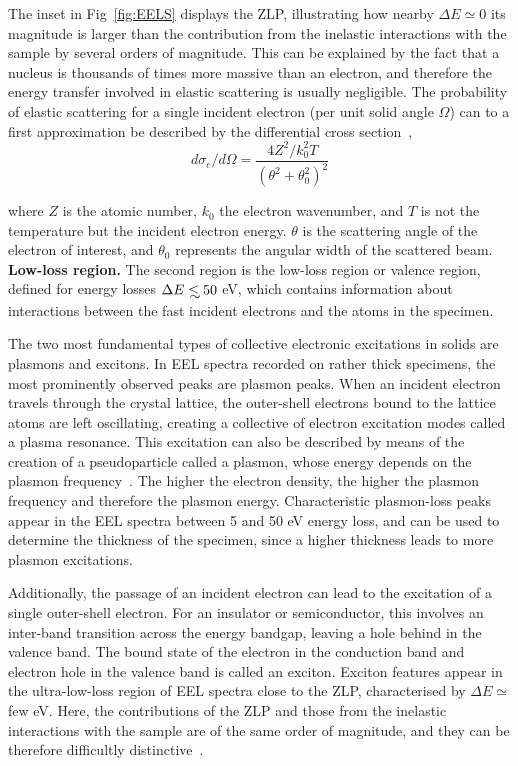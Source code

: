 The inset in Fig~\ref{fig:EELS} displays the ZLP, illustrating how nearby $\Delta E\simeq 0$
its magnitude is larger than the contribution from the inelastic interactions
with the sample by several orders of magnitude.
%
This can be explained by the fact that a nucleus is thousands of times more massive than an electron, 
and therefore the energy transfer involved in elastic scattering is usually negligible. 
%
The probability of elastic scattering for a single incident electron 
(per unit solid angle $\Omega$) can to a first approximation be described by 
the differential cross section~\cite{Egerton:1996},
\begin{equation}
    d\sigma_e / d\Omega = \frac{4Z^2/k_0^2T}{(\theta^2 + \theta_0^2)^2}
\end{equation}

where $Z$ is the atomic number, $k_0$ the electron wavenumber, 
and $T$ is not the temperature but the incident electron energy. 
$\theta$ is the scattering angle of the electron of interest, 
and $\theta_0$ represents the angular width of the scattered beam. \\

{\bf Low-loss region.} The second region is the low-loss region or valence region, defined for energy losses
$\Delta E \lsim 50$ eV, which contains information about interactions between the fast incident electrons
and the atoms in the specimen.

The two most fundamental types of collective electronic excitations in solids are plasmons and excitons.
%
In EEL spectra recorded on rather thick specimens, the most prominently observed peaks are plasmon peaks.
%
When an incident electron travels through the crystal lattice, the outer-shell electrons bound to the lattice atoms
are left oscillating, creating a collective of electron excitation modes called  a plasma resonance.
%
This excitation can also be described by means of the creation of a pseudoparticle called a plasmon, 
whose energy depends on the plasmon frequency~\cite{Nerl:2016}.
%
The higher the electron density, the higher the plasmon frequency and therefore the plasmon energy. 
%
Characteristic plasmon-loss peaks appear in the EEL spectra between 5 and 50 eV energy loss, and
can be used to determine the thickness of the specimen, since a higher thickness leads to more
plasmon excitations.

Additionally, the passage of an incident electron can lead to the excitation of a single outer-shell electron.
%
For an insulator or semiconductor, this involves an inter-band transition across the energy bandgap, leaving a hole
behind in the valence band. 
%
The bound state of the electron in the conduction band and electron hole in the valence band is called an exciton.
%
Exciton features appear in the ultra-low-loss region of EEL spectra close to the ZLP, 
characterised by $\Delta E \simeq$ few eV.
%
Here, the contributions of the ZLP and those from the inelastic interactions
with the sample are of the same order of magnitude, and they can be therefore difficultly distinctive~\cite{Abajo:2010}.

